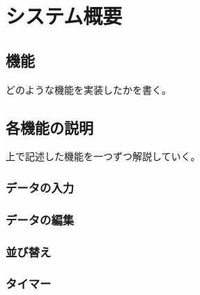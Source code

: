 \chapter{システム概要}
\label{cha:function}

\section{機能}
どのような機能を実装したかを書く。

\section{各機能の説明}
上で記述した機能を一つずつ解説していく。
\subsection{データの入力}
\subsection{データの編集}
\subsection{並び替え}
\subsection{タイマー}